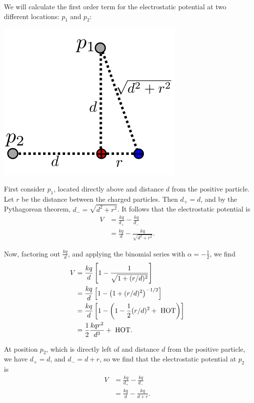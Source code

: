 \documentclass[twoside,openright,titlepage,a4paper]{book}
\begin{document}
\begin{sloppypar}
We will calculate the first order term for the electrostatic potential at two different locations: $p_1$ and $p_2$:
\begin{center}\includegraphics[scale=0.6]{DipolePositions}\end{center}

First consider $p_1$, located directly above and distance $d$ from the positive particle. Let $r$ be the distance between the charged particles. Then $d_+ = d$, and by the Pythagorean theorem, $d_- = \sqrt{d^2+r^2}$. It follows that the electrostatic potential is
\begin{align*} 
V &= \frac{kq}{d_+} - \frac{kq}{d_-} \\
&= \frac{kq}{d} - \frac{kq}{\sqrt{d^2+r^2}}. 
\end{align*}

Now, factoring out $\frac{kq}{d}$, and applying the binomial series with $\alpha = -\frac{1}{2}$, we find
\begin{align*} 
V &= \frac{kq}{d} \left[1 - \frac{1}{\sqrt{1+(r/d)^2}}\right] \\
&= \frac{kq}{d} \left[1 - \left(1+(r/d)^2\right)^{-1/2}\right] \\
&= \frac{kq}{d} \left[1 - \left(1 -\frac{1}{2} (r/d)^2 + \hbox{ HOT}\right)\right] \\
&= \frac{1}{2}\frac{kq r^2}{d^3} + \hbox{ HOT}.
\end{align*}

At position $p_2$, which is directly left of and distance $d$ from the positive particle, we have $d_+ = d$, and $d_- = d+r$, so we find that the electrostatic potential at $p_2$ is
\begin{align*} 
V &= \frac{kq}{d_+} - \frac{kq}{d_-} \\
&= \frac{kq}{d} - \frac{kq}{d+r}. 
\end{align*}


\end{sloppypar}
\end{document}
